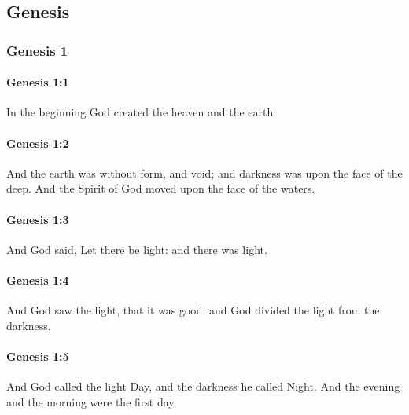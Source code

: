 \subsection{Genesis}
	\label{GENESIS}

	\subsubsection{Genesis 1} %
		\label{GENESIS-1}
	
		\paragraph{Genesis 1:1} %
			\label{GENESIS-1-1}

			In the beginning God created the heaven and the earth.

		\paragraph{Genesis 1:2} %
			\label{GENESIS-1-2}

			And the earth was without form, and void; and darkness was upon the face of the deep. And the Spirit of God moved upon the face of the waters.

		\paragraph{Genesis 1:3} %
			\label{GENESIS-1-3}

			And God said, Let there be light: and there was light. 

		\paragraph{Genesis 1:4} %
			\label{GENESIS-1-4}

			And God saw the light, that it was good: and God divided the light from the darkness. 

		\paragraph{Genesis 1:5} %
			\label{GENESIS-1-5}

			And God called the light Day, and the darkness he called Night. And the evening and the morning were the first day.

